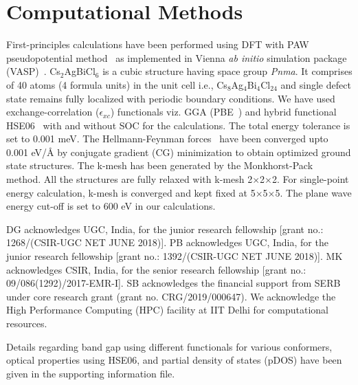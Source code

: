 \documentclass[journal=jpclcd,manuscript=letter]{achemso}
\begin{document}
\section{Computational Methods}
First-principles calculations have been performed using DFT with PAW pseudopotential method~\cite{hohenberg1964inhomogeneous, kohn1965self, blochl1994projector} as implemented in Vienna \textit{ab initio} simulation package (VASP)~\cite{kresse199614251}. Cs$_{2}$AgBiCl$_{6}$ is a cubic structure having space group \textit{Pnma}. It comprises of 40 atoms (4 formula units) in the unit cell i.e., Cs$_8$Ag$_4$Bi$_4$Cl$_{24}$ and single defect state remains fully localized with periodic boundary conditions. We have used exchange-correlation ($\epsilon_{xc}$) functionals viz. GGA (PBE~\cite{perdew1992atoms}) and hybrid functional HSE06~\cite{heyd2003hybrid} with and without SOC for the calculations. The total energy tolerance is set to 0.001 meV. The Hellmann-Feynman forces~\cite{pulay1980convergence} have been converged upto 0.001 eV/$\textrm{\AA}$ by conjugate gradient (CG) minimization to obtain optimized ground state structures. The k-mesh has been generated by the Monkhorst-Pack~\cite{monkhorst1976special} method. All the structures are fully relaxed with k-mesh 2$\times$2$\times$2. For single-point energy calculation, k-mesh is converged and kept fixed at 5$\times$5$\times$5. The plane wave energy cut-off is set to 600 eV in our calculations. 
\begin{acknowledgement}
DG acknowledges UGC, India, for the junior research fellowship [grant no.: 1268/(CSIR-UGC NET JUNE 2018)]. PB acknowledges UGC, India, for the junior research fellowship [grant no.: 1392/(CSIR-UGC NET JUNE 2018)]. MK acknowledges CSIR, India, for the senior research fellowship [grant no.: 09/086(1292)/2017-EMR-I]. SB acknowledges the financial support from SERB under core research grant (grant no. CRG/2019/000647). We acknowledge the High Performance Computing (HPC) facility at IIT Delhi for computational resources.
\end{acknowledgement}
\begin{suppinfo}
Details regarding band gap using different functionals for various conformers, optical properties using HSE06, and partial density of states (pDOS) have been given in the supporting information file. 
\end{suppinfo}
\end{document}
